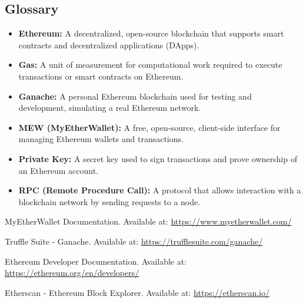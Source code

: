 \documentclass[11pt]{article}
\begin{document}
\subsection{Glossary}
\begin{itemize}
    \item \textbf{Ethereum:} A decentralized, open-source blockchain that supports smart contracts and decentralized applications (DApps).
    \item \textbf{Gas:} A unit of measurement for computational work required to execute transactions or smart contracts on Ethereum.
    \item \textbf{Ganache:} A personal Ethereum blockchain used for testing and development, simulating a real Ethereum network.
    \item \textbf{MEW (MyEtherWallet):} A free, open-source, client-side interface for managing Ethereum wallets and transactions.
    \item \textbf{Private Key:} A secret key used to sign transactions and prove ownership of an Ethereum account.
    \item \textbf{RPC (Remote Procedure Call):} A protocol that allows interaction with a blockchain network by sending requests to a node.
\end{itemize}

\clearpage
\begin{thebibliography}{9}
    
     MyEtherWallet Documentation. Available at: \url{https://www.myetherwallet.com/}
    
     Truffle Suite - Ganache. Available at: \url{https://trufflesuite.com/ganache/}
    
     Ethereum Developer Documentation. Available at: \url{https://ethereum.org/en/developers/}
    
     Etherscan - Ethereum Block Explorer. Available at: \url{https://etherscan.io/}
\end{thebibliography}
\end{document}
